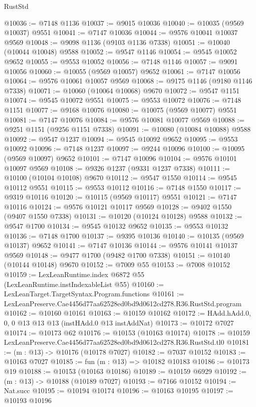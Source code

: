 \begin{lexlean}{RustStd}
\begin{coremodule}
@10036 := @7148 @1136
@10037 := @9015 @10036
@10040 := @10035 (@9569 @10037) @9551
@10041 := @7147 @10036
@10044 := @9576 @10041 @10037 @9569
@10048 := @9098 @1136 (@9103 @1136 @7338)
@10051 := @10040 (@10044 @10048) @9588
@10052 := @9547 @1146
@10054 := @9545 @10052 @9652
@10055 := @9553 @10052
@10056 := @7148 @1146
@10057 := @9091 @10056
@10060 := @10055 (@9569 @10057) @9652
@10061 := @7147 @10056
@10064 := @9576 @10061 @10057 @9569
@10068 := @9175 @1146 (@9180 @1146 @7338)
@10071 := @10060 (@10064 @10068) @9670
@10072 := @9547 @1151
@10074 := @9545 @10072 @9551
@10075 := @9553 @10072
@10076 := @7148 @1151
@10077 := @9168 @10076
@10080 := @10075 (@9569 @10077) @9551
@10081 := @7147 @10076
@10084 := @9576 @10081 @10077 @9569
@10088 := @9251 @1151 (@9256 @1151 @7338)
@10091 := @10080 (@10084 @10088) @9588
@10092 := @9547 @1237
@10094 := @9545 @10092 @9652
@10095 := @9553 @10092
@10096 := @7148 @1237
@10097 := @9244 @10096
@10100 := @10095 (@9569 @10097) @9652
@10101 := @7147 @10096
@10104 := @9576 @10101 @10097 @9569
@10108 := @9326 @1237 (@9331 @1237 @7338)
@10111 := @10100 (@10104 @10108) @9670
@10112 := @9547 @1550
@10114 := @9545 @10112 @9551
@10115 := @9553 @10112
@10116 := @7148 @1550
@10117 := @9319 @10116
@10120 := @10115 (@9569 @10117) @9551
@10121 := @7147 @10116
@10124 := @9576 @10121 @10117 @9569
@10128 := @9402 @1550 (@9407 @1550 @7338)
@10131 := @10120 (@10124 @10128) @9588
@10132 := @9547 @1700
@10134 := @9545 @10132 @9652
@10135 := @9553 @10132
@10136 := @7148 @1700
@10137 := @9395 @10136
@10140 := @10135 (@9569 @10137) @9652
@10141 := @7147 @10136
@10144 := @9576 @10141 @10137 @9569
@10148 := @9477 @1700 (@9482 @1700 @7338)
@10151 := @10140 (@10144 @10148) @9670
@10152 := @7009 @55
@10153 := @7008 @10152
@10159 := LexLeanRuntime.index @6872 @55 (LexLeanRuntime.instIndexableList @55)
@10160 := LexLeanTarget.TargetSyntax.Program.functions
@10161 := LexLeanPreserve.Cae4456d77aa62528ed0bd9d0612cd278.R36.RustStd.program
@10162 := @10160 @10161
@10163 := @10159 @10162
@10172 := HAdd.hAdd.{0, 0, 0} @13 @13 @13 (instHAdd.{0} @13 instAddNat)
@10173 := @10172 @7027
@10174 := @10173 @62
@10176 := @10153 (@10163 @10174)
@10178 := @10159 LexLeanPreserve.Cae4456d77aa62528ed0bd9d0612cd278.R36.RustStd.tl0
@10181 := (m : @13) -> @10176 (@10178 @7027)
@10182 := @7037 @10152
@10183 := @10163 @7027
@10185 := fun (m : @13) => @10182 @10183
@10186 := @10173 @19
@10188 := @10153 (@10163 @10186)
@10189 := @10159 @6929
@10192 := (m : @13) -> @10188 (@10189 @7027)
@10193 := @7166 @10152
@10194 := Nat.succ
@10195 := @10194 @10174
@10196 := @10163 @10195
@10197 := @10193 @10196

\end{coremodule}
\end{lexlean}
